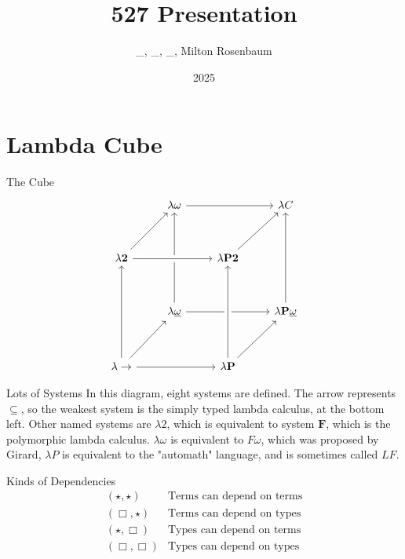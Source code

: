 \documentclass{beamer}
\title{527 Presentation}
\author{\_, \_, \_, Milton Rosenbaum}
\institute{Comp 527}
\date{2025}
\begin{document}
\frame{\titlepage}

\section{Lambda Cube}

\begin{frame}{The Cube}
\[\begin{tikzcd}[ampersand replacement=\&, row sep=3.4em]
    \& \lambda\omega \arrow[rr] \arrow[from=dd] \&\& \lambda C \\
    \lambda \textbf{2} \arrow[ur] \arrow[rr, crossing over] \&\& \lambda \textbf{P2} \arrow[ur] \& \\
	\& \lambda\underline{\omega} \arrow[rr] \&\& \lambda \textbf{P} \underline{\omega} \arrow[uu] \\
	\lambda\rightarrow \arrow[uu] \arrow[rr] \arrow[ur] \&\& \lambda \textbf{P} \arrow[ur] \arrow[uu, crossing over]
\end{tikzcd}\]
\end{frame}

\begin{frame}{Lots of Systems}
    In this diagram, eight systems are defined. The arrow represents $\subseteq$, so the weakest system is the simply typed lambda calculus, at the bottom left. Other named systems are $\lambda 2$, which is equivalent to system $\textbf{F}$, which is the polymorphic lambda calculus. $\lambda\omega$ is equivalent to $F\omega$, which was proposed by Girard, $\lambda P$ is equivalent to the "automath" language, and is sometimes called $LF$.
\end{frame}

\begin{frame}{Kinds of Dependencies}
    \[\begin{array}{c|l}
        (\star, \star) & \text{Terms can depend on terms} \\
        (\Box, \star) & \text{Terms can depend on types} \\
        (\star, \Box) & \text{Types can depend on terms} \\
        (\Box, \Box) & \text{Types can depend on types} \\
    \end{array}
    \]
\end{frame}
\end{document}
